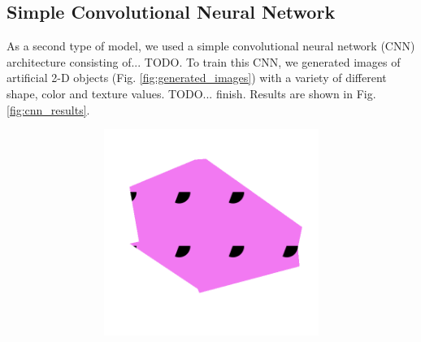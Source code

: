 \subsection{Simple Convolutional Neural Network}
\label{sec:simple_cnn}
As a second type of model, we used a simple convolutional neural network (CNN) architecture
consisting of... TODO. To train this CNN, we generated images of artificial 2-D objects
(Fig. \ref{fig:generated_images}) with a variety of different shape, color and texture values. TODO... finish.
Results are shown in Fig. \ref{fig:cnn_results}.

\begin{figure}[h!]
    \begin{center}
        \begin{subfigure}[b]{0.3\textwidth}
            \begin{center}
                \begin{subfigure}[b]{0.4\textwidth}
                    \includegraphics[width=\linewidth]{figures/generated_objects/img0000.png}
                \end{subfigure}
                \begin{subfigure}[b]{0.4\textwidth}

\end{subfigure}
\end{center}
\end{subfigure}
\end{center}
\end{figure}
